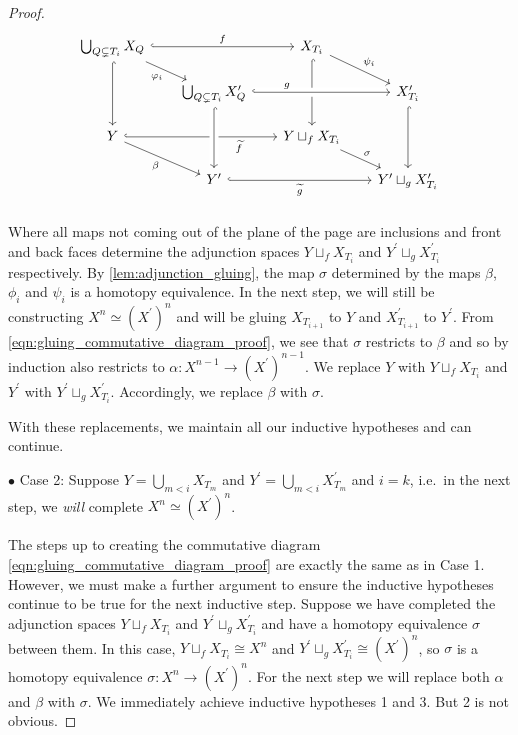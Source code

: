 \documentclass[class=article, crop=false]{standalone}
\begin{document}
\begin{proof}
    \begin{equation}
        \begin{tikzcd}[row sep=scriptsize, column sep=scriptsize]
            \bigcup_{Q \subsetneq T_i} X_{Q} \ar[dr, "\phi_i"'] \ar[rr, hookrightarrow, "f"] \ar[dd, hookrightarrow]     &  &   X_{T_i} \ar[dr, "\psi_i"] \ar[dd, hookrightarrow]  &  \\
            &   \bigcup_{Q \subsetneq T_i} X^\prime_{Q} \ar[rr, crossing over, hookrightarrow, "g" near start] & &  X^\prime_{T_i}\ar[dd, hookrightarrow]                         \\
            Y \ar[dr, "\beta"'] \ar[rr, hookrightarrow, "\widetilde{f}"', near end]  & &   Y \sqcup_f X_{T_i} \ar[dr, "\sigma"] &                                              \\
            &   Y^\prime \ar[rr, hookrightarrow, "\widetilde{g}"']  \ar[from=uu, crossing over, hookrightarrow]    &    &   Y^\prime\sqcup_g X^\prime_{T_i}                     \\
        \end{tikzcd}
    \label{eqn:gluing_commutative_diagram_proof}
    \end{equation}
    Where all maps not coming out of the plane of the page are inclusions and front and back faces determine the adjunction spaces $ Y \sqcup_f X_{T_i}$ and $Y^\prime\sqcup_g X^\prime_{T_i}$ respectively. By \cref{lem:adjunction_gluing}, the map $\sigma$ determined by the maps $\beta$, $\phi_i$ and $\psi_i$ is a homotopy equivalence.
    In the next step, we will still be constructing $X^n \simeq (X^\prime)^n$ and will be gluing $X_{T_{i+1}}$ to $Y$ and $X^\prime_{T_{i+1}}$ to $Y^\prime$. From \eqref{eqn:gluing_commutative_diagram_proof}, we see that $\sigma$ restricts to $\beta$ and so by induction also restricts to $\alpha \colon X^{n-1} \to (X^\prime)^{n-1}$. We replace $Y$ with $ Y \sqcup_f X_{T_i}$ and $Y^\prime$ with $Y^\prime\sqcup_g X^\prime_{T_i}$. Accordingly, we replace $\beta$ with $\sigma$. 

    With these replacements, we maintain all our inductive hypotheses and can continue.

    $\bullet$ Case 2: Suppose $Y = \bigcup_{m < i} X_{T_m}$ and $Y^\prime = \bigcup_{m < i} X^\prime_{T_m}$ and $i = k$, i.e.~in the next step, we \emph{will} complete $X^n \simeq (X^\prime)^n$.

    The steps up to creating the commutative diagram \eqref{eqn:gluing_commutative_diagram_proof} are exactly the same as in Case 1. However, we must make a further argument to ensure the inductive hypotheses continue to be true for the next inductive step. Suppose we have completed the adjunction spaces $ Y \sqcup_f X_{T_i}$ and $Y^\prime\sqcup_g X^\prime_{T_i}$ and have a homotopy equivalence $\sigma$ between them. In this case, $ Y \sqcup_f X_{T_i} \cong X^n$ and $Y^\prime\sqcup_g X^\prime_{T_i} \cong (X^\prime)^{n}$, so $\sigma$ is a homotopy equivalence $\sigma \colon X^n \to (X^\prime)^n$. For the next step we will replace both $\alpha$ and $\beta$ with $\sigma$. We immediately achieve inductive hypotheses 1 and 3. But 2 is not obvious.
    

\end{proof}
\end{document}
